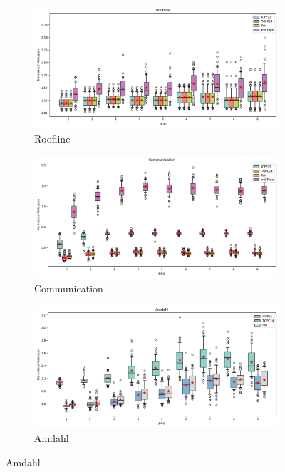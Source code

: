 \documentclass{article}
\begin{document}
\begin{figure}[htbp]
\centering
\begin{subfigure}[b]{0.32\textwidth}\includegraphics[width=\textwidth]{Results/Jump/Jump_Roofline_boxplot}\caption{Roofline}\label{fig:boxplot_figures_Jump_Roofline}\end{subfigure}
\hfill
\begin{subfigure}[b]{0.32\textwidth}\includegraphics[width=\textwidth]{Results/Jump/Jump_Communication_boxplot}\caption{Communication}\label{fig:boxplot_figures_Jump_Communication}\end{subfigure}
\hfill
\begin{subfigure}[b]{0.32\textwidth}\includegraphics[width=\textwidth]{Results/Jump/Jump_Amdahl_boxplot}\caption{Amdahl}\label{fig:boxplot_figures_Jump_Amdahl}\end{subfigure}

\end{figure}
\end{document}
